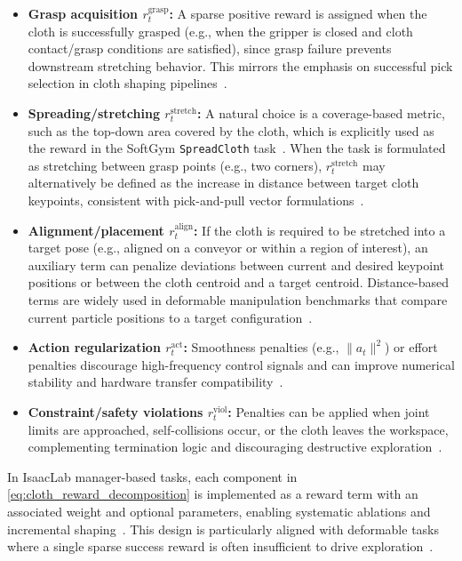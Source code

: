\begin{itemize}
    \item \textbf{Grasp acquisition $r^{\text{grasp}}_t$:} A sparse positive reward is assigned when the cloth is successfully grasped (e.g., when the gripper is closed and cloth contact/grasp conditions are satisfied), since grasp failure prevents downstream stretching behavior. This mirrors the emphasis on successful pick selection in cloth shaping pipelines~\cite{Kadi2023ClothLikeReview}. %
    \item \textbf{Spreading/stretching $r^{\text{stretch}}_t$:} A natural choice is a coverage-based metric, such as the top-down area covered by the cloth, which is explicitly used as the reward in the SoftGym \texttt{SpreadCloth} task~\cite{Lin2021SoftGym}. When the task is formulated as stretching between grasp points (e.g., two corners), $r^{\text{stretch}}_t$ may alternatively be defined as the increase in distance between target cloth keypoints, consistent with pick-and-pull vector formulations~\cite{Seita2020FabricSmoothing}.
    \item \textbf{Alignment/placement $r^{\text{align}}_t$:} If the cloth is required to be stretched into a target pose (e.g., aligned on a conveyor or within a region of interest), an auxiliary term can penalize deviations between current and desired keypoint positions or between the cloth centroid and a target centroid. Distance-based terms are widely used in deformable manipulation benchmarks that compare current particle positions to a target configuration~\cite{Lin2021SoftGym}.
    \item \textbf{Action regularization $r^{\text{act}}_t$:} Smoothness penalties (e.g., $\|a_t\|^2$) or effort penalties discourage high-frequency control signals and can improve numerical stability and hardware transfer compatibility~\cite{Siciliano2009Robotics}. %
    \item \textbf{Constraint/safety violations $r^{\text{viol}}_t$:} Penalties can be applied when joint limits are approached, self-collisions occur, or the cloth leaves the workspace, complementing termination logic and discouraging destructive exploration~\cite{isaaclab_mdp_terms_api}.
\end{itemize}

In IsaacLab manager-based tasks, each component in \autoref{eq:cloth_reward_decomposition} is implemented as a reward term with an associated weight and optional parameters, enabling systematic ablations and incremental shaping~\cite{isaaclab_task_design_workflows,isaaclab_mdp_terms_api}. This design is particularly aligned with deformable tasks where a single sparse success reward is often insufficient to drive exploration~\cite{Lin2021SoftGym,Kadi2023ClothLikeReview}.

